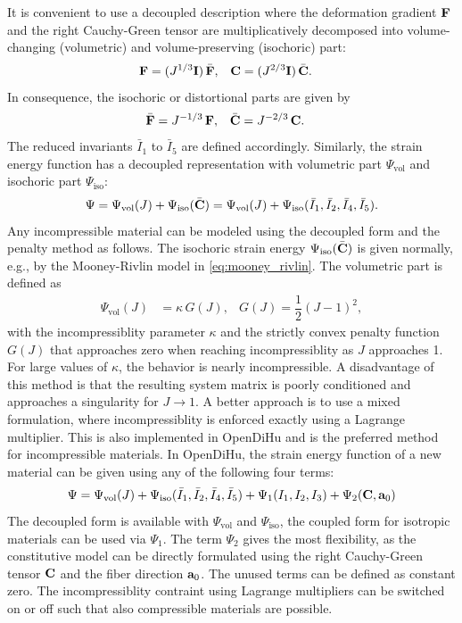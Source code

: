 It is convenient to use a decoupled description where the deformation gradient $\textbf{F}$ and the right Cauchy-Green tensor are multiplicatively decomposed into volume-changing (volumetric) and volume-preserving (isochoric) part:%
\begin{align*}
  \textbf{F} &= (J^{1/3}\textbf{I})\,\bar{\textbf{F}},  & \textbf{C} &= (J^{2/3}\textbf{I})\,\bar{\textbf{C}}.
\end{align*}
%
In consequence, the isochoric or distortional parts are given by%
\begin{align*}
  \bar{\textbf{F}} &= J^{-1/3}\,\textbf{F},  & \bar{\textbf{C}} &= J^{-2/3}\,\textbf{C}.
\end{align*}
The reduced invariants $\bar{I}_1$ to $\bar{I}_5$ are defined accordingly.
Similarly, the strain energy function has a decoupled representation with volumetric part $\Psi_\text{vol}$ and isochoric part $\Psi_\text{iso}$:
\begin{align*}
  \Psi = \Psi_\text{vol}(J) + \Psi_\text{iso}(\bar{\textbf{C}}) = \Psi_\text{vol}(J) + \Psi_\text{iso}(\bar{I}_1,\bar{I}_2,\bar{I}_4,\bar{I}_5).
\end{align*}
%
Any incompressible material can be modeled using the decoupled form and the penalty method as follows. 
The isochoric strain energy $\Psi_\text{iso}(\bar{\textbf{C}})$ is given normally, e.g., by the Mooney-Rivlin model in \cref{eq:mooney_rivlin}. The volumetric part is defined as
\begin{align*}
  \Psi_\text{vol}(J) &= \kappa\,G(J), & G(J) = \dfrac12 (J-1)^2,
\end{align*}
with the incompressiblity parameter $\kappa$ and the strictly convex penalty function $G(J)$ that approaches zero when reaching incompressiblity as $J$ approaches 1. For large values of $\kappa$, the behavior is nearly incompressible. A disadvantage of this method is that the resulting system matrix is poorly conditioned and approaches a singularity for $J \to 1$.
A better approach is to use a mixed formulation, where incompressiblity is enforced exactly using a Lagrange multiplier. This is also implemented in OpenDiHu and is the preferred method for incompressible materials. In OpenDiHu, the strain energy function of a new material can be given using any of the following four terms:
%
\begin{align*}
  \Psi = \Psi_\text{vol}(J) + \Psi_\text{iso}(\bar{I}_1,\bar{I}_2,\bar{I}_4,\bar{I}_5) + \Psi_1(I_1,I_2,I_3) + \Psi_2(\textbf{C},\textbf{a}_0)
\end{align*}
The decoupled form is available with $\Psi_\text{vol}$ and $\Psi_\text{iso}$, the coupled form for isotropic materials can be used via $\Psi_1$. The term $\Psi_2$ gives the most flexibility, as the constitutive model can be directly formulated using the right Cauchy-Green tensor $\textbf{C}$ and the fiber direction $\textbf{a}_0$. The unused terms can be defined as constant zero. The incompressiblity contraint using Lagrange multipliers can be switched on or off such that also compressible materials are possible.
%

